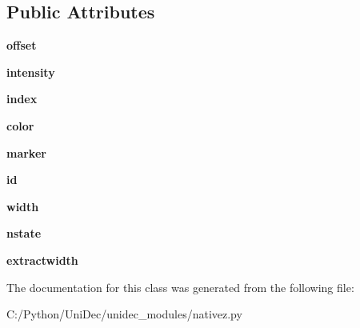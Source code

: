 \subsection*{Public Attributes}
\begin{DoxyCompactItemize}
\item 
\hypertarget{class_uni_dec_1_1unidec__modules_1_1nativez_1_1zoffset_aa2fef75feca02229d181229efc5825d8}{}{\bfseries offset}\label{class_uni_dec_1_1unidec__modules_1_1nativez_1_1zoffset_aa2fef75feca02229d181229efc5825d8}

\item 
\hypertarget{class_uni_dec_1_1unidec__modules_1_1nativez_1_1zoffset_ae39dac67224a27af1b4c38ed0375d06e}{}{\bfseries intensity}\label{class_uni_dec_1_1unidec__modules_1_1nativez_1_1zoffset_ae39dac67224a27af1b4c38ed0375d06e}

\item 
\hypertarget{class_uni_dec_1_1unidec__modules_1_1nativez_1_1zoffset_acdd247a58e45b43314530d0d7cb8f8b5}{}{\bfseries index}\label{class_uni_dec_1_1unidec__modules_1_1nativez_1_1zoffset_acdd247a58e45b43314530d0d7cb8f8b5}

\item 
\hypertarget{class_uni_dec_1_1unidec__modules_1_1nativez_1_1zoffset_a79af5199d4391ece8e84e39687465647}{}{\bfseries color}\label{class_uni_dec_1_1unidec__modules_1_1nativez_1_1zoffset_a79af5199d4391ece8e84e39687465647}

\item 
\hypertarget{class_uni_dec_1_1unidec__modules_1_1nativez_1_1zoffset_a57186eeecc1a7142e572b20af608e843}{}{\bfseries marker}\label{class_uni_dec_1_1unidec__modules_1_1nativez_1_1zoffset_a57186eeecc1a7142e572b20af608e843}

\item 
\hypertarget{class_uni_dec_1_1unidec__modules_1_1nativez_1_1zoffset_aa99fcb916d60d37e25e907c0b23a565c}{}{\bfseries id}\label{class_uni_dec_1_1unidec__modules_1_1nativez_1_1zoffset_aa99fcb916d60d37e25e907c0b23a565c}

\item 
\hypertarget{class_uni_dec_1_1unidec__modules_1_1nativez_1_1zoffset_afe41c46bc6f62331582d06f3f0ecfa0c}{}{\bfseries width}\label{class_uni_dec_1_1unidec__modules_1_1nativez_1_1zoffset_afe41c46bc6f62331582d06f3f0ecfa0c}

\item 
\hypertarget{class_uni_dec_1_1unidec__modules_1_1nativez_1_1zoffset_a595f20315e47fe1c0af28af632ae4f64}{}{\bfseries nstate}\label{class_uni_dec_1_1unidec__modules_1_1nativez_1_1zoffset_a595f20315e47fe1c0af28af632ae4f64}

\item 
\hypertarget{class_uni_dec_1_1unidec__modules_1_1nativez_1_1zoffset_a1b9f3e08ffd0e9dfafc98c61dab8b5ed}{}{\bfseries extractwidth}\label{class_uni_dec_1_1unidec__modules_1_1nativez_1_1zoffset_a1b9f3e08ffd0e9dfafc98c61dab8b5ed}

\end{DoxyCompactItemize}


The documentation for this class was generated from the following file\+:\begin{DoxyCompactItemize}
\item 
C\+:/\+Python/\+Uni\+Dec/unidec\+\_\+modules/nativez.\+py\end{DoxyCompactItemize}
